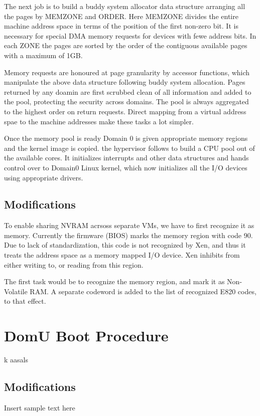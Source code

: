 The next job is to build a buddy system allocator data structure arranging all the pages by MEMZONE and ORDER. Here MEMZONE divides the entire machine address space in terms of the position of the first non-zero bit. It is necessary for special DMA memory requests for devices with fewe address bits. In each ZONE the pages are sorted by the order of the contiguous available pages with a maximum of 1GB. 
 
Memory requests are honoured at page granularity by accessor functions, which manipulate the above data structure following buddy system allocation. Pages returned by any doamin are first scrubbed clean of all information and added to the pool, protecting the security across domains. The pool is always  aggregated to the highest order on return requests. Direct mapping from a virtual address spae to the machine addresses make these tasks a lot simpler. 
 
Once the memory pool is ready Domain 0 is given appropriate memory regions and the kernel image is copied. the hypervisor follows to build a CPU pool out of the available cores. It initializes interrupts and other data structures and hands control over to Domain0 Linux kernel, which now initializes all the I/O devices using appropriate drivers. 



\subsection{Modifications}

To enable sharing NVRAM acrsoss separate VMs, we have to first recognize it as memory. Currently the firmware (BIOS) marks the memory region with code 90. Due to lack of standardization, this code is not recognized by Xen, and thus it treats the address space as a memory mapped I/O device. Xen inhibits from either writing to, or reading from this region. 
 
The first task would be to recognize the memory region, and mark it as Non-Volatile RAM. A separate codeword is added to the list of recognized E820 codes, to that effect. 



\section{DomU Boot Procedure}
k
aasals

\subsection{Modifications}


Insert sample text here





